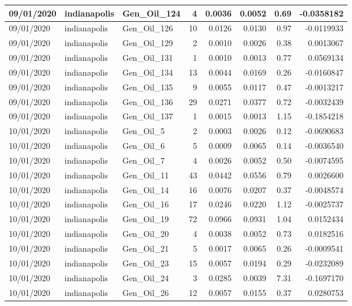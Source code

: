 \documentclass[
  letterpaper,
  DIV=11,
  numbers=noendperiod]{scrartcl}
\begin{document}
\begin{tabular}{l|l|l|r|r|r|r|r}
\hline
09/01/2020 & indianapolis & Gen\_Oil\_124 & 4 & 0.0036 & 0.0052 & 0.69 & -0.0358182\\
\hline
09/01/2020 & indianapolis & Gen\_Oil\_126 & 10 & 0.0126 & 0.0130 & 0.97 & -0.0119933\\
\hline
09/01/2020 & indianapolis & Gen\_Oil\_129 & 2 & 0.0010 & 0.0026 & 0.38 & 0.0013067\\
\hline
09/01/2020 & indianapolis & Gen\_Oil\_131 & 1 & 0.0010 & 0.0013 & 0.77 & 0.0569134\\
\hline
09/01/2020 & indianapolis & Gen\_Oil\_134 & 13 & 0.0044 & 0.0169 & 0.26 & -0.0160847\\
\hline
09/01/2020 & indianapolis & Gen\_Oil\_135 & 9 & 0.0055 & 0.0117 & 0.47 & -0.0013217\\
\hline
09/01/2020 & indianapolis & Gen\_Oil\_136 & 29 & 0.0271 & 0.0377 & 0.72 & -0.0032439\\
\hline
09/01/2020 & indianapolis & Gen\_Oil\_137 & 1 & 0.0015 & 0.0013 & 1.15 & -0.1854218\\
\hline
10/01/2020 & indianapolis & Gen\_Oil\_5 & 2 & 0.0003 & 0.0026 & 0.12 & -0.0690683\\
\hline
10/01/2020 & indianapolis & Gen\_Oil\_6 & 5 & 0.0009 & 0.0065 & 0.14 & -0.0036540\\
\hline
10/01/2020 & indianapolis & Gen\_Oil\_7 & 4 & 0.0026 & 0.0052 & 0.50 & -0.0074595\\
\hline
10/01/2020 & indianapolis & Gen\_Oil\_11 & 43 & 0.0442 & 0.0556 & 0.79 & 0.0026600\\
\hline
10/01/2020 & indianapolis & Gen\_Oil\_14 & 16 & 0.0076 & 0.0207 & 0.37 & -0.0048574\\
\hline
10/01/2020 & indianapolis & Gen\_Oil\_16 & 17 & 0.0246 & 0.0220 & 1.12 & -0.0025737\\
\hline
10/01/2020 & indianapolis & Gen\_Oil\_19 & 72 & 0.0966 & 0.0931 & 1.04 & 0.0152434\\
\hline
10/01/2020 & indianapolis & Gen\_Oil\_20 & 4 & 0.0038 & 0.0052 & 0.73 & 0.0182516\\
\hline
10/01/2020 & indianapolis & Gen\_Oil\_21 & 5 & 0.0017 & 0.0065 & 0.26 & -0.0009541\\
\hline
10/01/2020 & indianapolis & Gen\_Oil\_23 & 15 & 0.0057 & 0.0194 & 0.29 & -0.0232089\\
\hline
10/01/2020 & indianapolis & Gen\_Oil\_24 & 3 & 0.0285 & 0.0039 & 7.31 & -0.1697170\\
\hline
10/01/2020 & indianapolis & Gen\_Oil\_26 & 12 & 0.0057 & 0.0155 & 0.37 & 0.0280753\\

\end{tabular}
\end{document}
